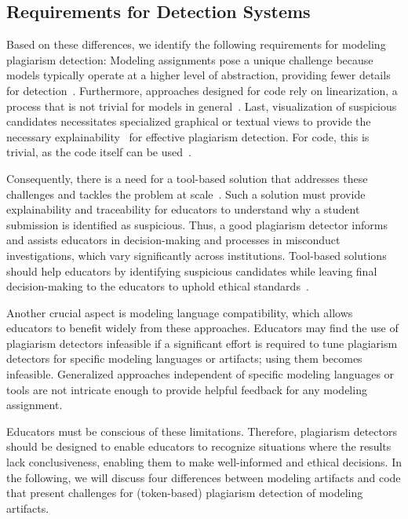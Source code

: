 \subsection{Requirements for Detection Systems}
Based on these differences, we identify the following requirements for modeling plagiarism detection:
Modeling assignments pose a unique challenge because models typically operate at a higher level of abstraction, providing fewer details for detection~\cite{Saglam2022}. Furthermore, approaches designed for code rely on linearization, a process that is not trivial for models in general~\cite{Saglam2024a}. 
Last, visualization of suspicious candidates necessitates specialized graphical or textual views to provide the necessary explainability~\cite{Karnalim2021} for effective plagiarism detection. For code, this is trivial, as the code itself can be used~\cite{Saglam2024a}.

Consequently, there is a need for a tool-based solution that addresses these challenges and tackles the problem at scale~\cite{Saglam2023}.
Such a solution must provide explainability and traceability for educators to understand why a student submission is identified as suspicious.
Thus, a good plagiarism detector informs and assists educators in decision-making and processes in misconduct investigations, which vary significantly across institutions.
Tool-based solutions should help educators by identifying suspicious candidates while leaving final decision-making to the educators to uphold ethical standards~\cite{Le2013}.

Another crucial aspect is modeling language compatibility, which allows educators to benefit widely from these approaches.
Educators may find the use of plagiarism detectors infeasible if a significant effort is required to tune plagiarism detectors for specific modeling languages or artifacts; using them becomes infeasible.
Generalized approaches independent of specific modeling languages or tools are not intricate enough to provide helpful feedback for any modeling assignment.
%

Educators must be conscious of these limitations. Therefore, plagiarism detectors should be designed to enable educators to recognize situations where the results lack conclusiveness, enabling them to make well-informed and ethical decisions.
In the following, we will discuss four differences between modeling artifacts and code that present challenges for (token-based) plagiarism detection of modeling artifacts.

